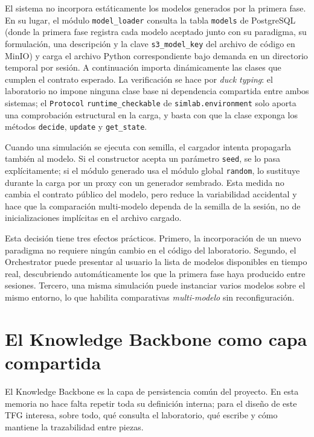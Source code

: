El sistema no incorpora estáticamente los modelos generados por la primera
fase. En su lugar, el módulo \texttt{model\_loader} consulta la tabla
\texttt{models} de PostgreSQL (donde la primera fase registra cada
modelo aceptado junto con su paradigma, su formulación, una
descripción y la clave \texttt{s3\_model\_key} del archivo de código en
MinIO) y carga el archivo Python correspondiente bajo demanda en un
directorio temporal por sesión. A continuación importa dinámicamente
las clases que cumplen el contrato esperado. La verificación se hace
por \textit{duck typing}: el laboratorio no impone ninguna clase base ni
dependencia compartida entre ambos sistemas; el \texttt{Protocol}
\texttt{runtime\_checkable} de \texttt{simlab.environment} solo aporta una
comprobación estructural en la carga, y basta con que la clase exponga los
métodos \texttt{decide}, \texttt{update} y \texttt{get\_state}.

Cuando una simulación se ejecuta con semilla, el cargador intenta propagarla
también al modelo. Si el constructor acepta un parámetro \texttt{seed}, se lo
pasa explícitamente; si el módulo generado usa el módulo global
\texttt{random}, lo sustituye durante la carga por un proxy con un generador
sembrado. Esta medida no cambia el contrato público del modelo, pero reduce la
variabilidad accidental y hace que la comparación multi-modelo dependa de la
semilla de la sesión, no de inicializaciones implícitas en el archivo cargado.

Esta decisión tiene tres efectos prácticos. Primero, la incorporación de
un nuevo paradigma no requiere ningún cambio en el código del laboratorio.
Segundo, el Orchestrator puede presentar al usuario la lista de
modelos disponibles en tiempo real, descubriendo automáticamente los que
la primera fase haya producido entre sesiones. Tercero, una misma
simulación puede instanciar varios modelos sobre el mismo entorno, lo
que habilita comparativas \textit{multi-modelo} sin reconfiguración.

\section{El Knowledge Backbone como capa compartida}

El Knowledge Backbone es la capa de persistencia común del proyecto. En esta
memoria no hace falta repetir toda su definición interna;
para el diseño de este TFG interesa, sobre todo, qué consulta el
laboratorio, qué escribe y cómo mantiene la trazabilidad entre piezas.


